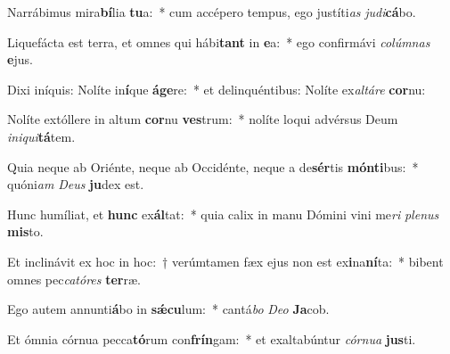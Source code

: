 \item Narrábimus mira\textbf{bí}lia \textbf{tu}a:~* cum accépero tempus, ego justíti\textit{as} \textit{ju}\textit{di}\textbf{cá}bo.
\item Liquefácta est terra, et omnes qui hábi\textbf{tant} in \textbf{e}a:~* ego confirmávi \textit{co}\textit{lúm}\textit{nas} \textbf{e}jus.
\item Dixi iníquis: Nolíte in\textbf{í}que \textbf{á}\textbf{ge}re:~* et delinquéntibus: Nolíte ex\textit{al}\textit{tá}\textit{re} \textbf{cor}nu:
\item Nolíte extóllere in altum \textbf{cor}nu \textbf{ves}trum:~* nolíte loqui advérsus Deum \textit{in}\textit{i}\textit{qui}\textbf{tá}tem.
\item Quia neque ab Oriénte, neque ab Occidénte, neque a de\textbf{sér}tis \textbf{món}\textbf{ti}bus:~* quóni\textit{am} \textit{De}\textit{us} \textbf{ju}dex est.
\item Hunc humíliat, et \textbf{hunc} ex\textbf{ál}tat:~* quia calix in manu Dómini vini me\textit{ri} \textit{ple}\textit{nus} \textbf{mis}to.
\item Et inclinávit ex hoc in hoc:~† verúmtamen fæx ejus non est ex\textbf{i}na\textbf{ní}ta:~* bibent omnes pec\textit{ca}\textit{tó}\textit{res} \textbf{ter}ræ.
\item Ego autem annunti\textbf{á}bo in \textbf{sǽ}\textbf{cu}lum:~* cantá\textit{bo} \textit{De}\textit{o} \textbf{Ja}cob.
\item Et ómnia córnua pecca\textbf{tó}rum con\textbf{frín}gam:~* et exaltabúntur \textit{cór}\textit{nu}\textit{a} \textbf{jus}ti.

